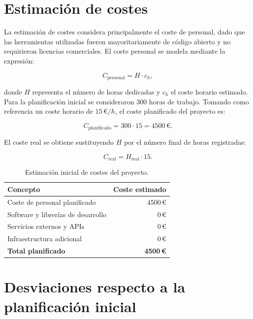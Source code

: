 \section{Estimación de costes}\label{sec:estimacion-costes}

La estimación de costes considera principalmente el coste de personal, dado que las herramientas utilizadas fueron mayoritariamente de código abierto y no requirieron licencias comerciales. El coste personal se modela mediante la expresión:

\begin{equation}
    C_{\text{personal}} = H \cdot c_h,
\end{equation}

donde \(H\) representa el número de horas dedicadas y \(c_h\) el coste horario estimado. Para la planificación inicial se consideraron 300 horas de trabajo. Tomando como referencia un coste horario de \(15\,\text{€}/h\), el coste planificado del proyecto es:

\begin{equation}
    C_{\text{planificado}} = 300 \cdot 15 = 4500\,\text{€}.
\end{equation}

El coste real se obtiene sustituyendo \(H\) por el número final de horas registradas:

\begin{equation}
    C_{\text{real}} = H_{\text{real}} \cdot 15.
\end{equation}

\begin{table}[ht]
\centering
\begin{tabular}{l r}
\hline
\textbf{Concepto} & \textbf{Coste estimado} \\
\hline
Coste de personal planificado & 4500\,€ \\
Software y librerías de desarrollo & 0\,€ \\
Servicios externos y APIs & 0\,€ \\
Infraestructura adicional & 0\,€ \\
\hline
\textbf{Total planificado} & \textbf{4500\,€} \\
\hline
\end{tabular}
\caption{Estimación inicial de costes del proyecto.}
\label{tab:costes-planificados}
\end{table}

\section{Desviaciones respecto a la planificación inicial}\label{sec:desviaciones}

